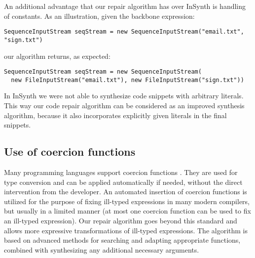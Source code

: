 An additional advantage that our repair algorithm has over InSynth is handling of constants. 
As an illustration, given the backbone expression:
\begin{lstlisting}
SequenceInputStream seqStream = new SequenceInputStream("email.txt", "sign.txt") 
\end{lstlisting}
our algorithm returns, as expected:
\begin{lstlisting}
SequenceInputStream seqStream = new SequenceInputStream(
  new FileInputStream("email.txt"), new FileInputStream("sign.txt"))
\end{lstlisting}
In InSynth we were not able to synthesize code snippets with arbitrary literals. 
This way our code repair algorithm can be considered as an improved synthesis algorithm,
because it also incorporates explicitly given literals in the final snippets.

%

\subsection{Use of coercion functions}

Many programming languages support coercion functions \cite{TannenCoercionS91}. 
They are used for type conversion and can be applied automatically if needed, 
without the direct intervention from the developer. An automated insertion of
coercion functions is utilized for the purpose of fixing ill-typed
expressions in many modern compilers, but usually in a limited manner 
(at most one coercion function can be used to fix an ill-typed expression).
Our repair algorithm goes beyond this standard and allows more expressive transformations of
ill-typed expressions. The algorithm is based on advanced methods for searching and adapting 
appropriate functions, combined with synthesizing any additional necessary
arguments.

